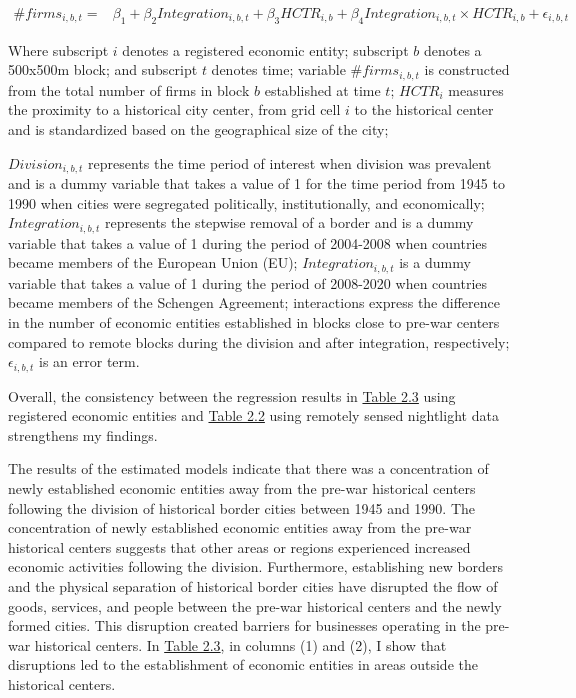 \documentclass[12pt]{article}    %
\begin{document}
\begin{equation}
\renewcommand\theequation{2.3}
\begin{split}
\# firms_{i,b,t}=&\beta_1+\beta _2 Integration_{i,b,t}+ \beta_{3} HCTR_{i,b} +\beta_4 Integration_{i,b,t}\times HCTR_{i,b}+\epsilon_{i,b,t}
    \end{split}
\end{equation}
\par 


Where subscript $i$ denotes a registered economic entity; subscript $b$ denotes a 500x500m block; and subscript $t$ denotes time; variable $\# firms_{i,b,t}$ is constructed from the total number of firms in block $b$ established at time $t$; $HCTR_{i}$ measures the proximity  to a historical city center, from grid cell $i$ to the historical center and is standardized based on the geographical size of the city; 



$Division_{i,b,t}$ represents the time period of interest when division was prevalent and is a dummy variable that takes a value of 1 for the time period from 1945 to 1990 when cities were  segregated politically, institutionally, and economically; $Integration_{i,b,t}$  represents the stepwise removal of a border and is a dummy variable that takes a value of 1 during the period of 2004-2008 when countries became members of the European Union (EU); $Integration_{i,b,t}$ is a dummy variable that takes a value of 1 during the period of 2008-2020 when countries became members of the Schengen Agreement; interactions express the difference in the number of economic entities established in blocks close to pre-war centers compared to remote blocks during the division and after integration, respectively; $\epsilon_{i,b,t}$ is an error term.

\par Overall, the consistency between the regression results in \hyperlink{Table 2.3}{Table 2.3} using registered economic entities and \hyperlink{Table 2.2}{Table 2.2} using remotely sensed nightlight data strengthens my findings. 

\par The results of the estimated models indicate that there was a concentration of newly established economic entities away from the pre-war historical centers following the division of historical border cities between 1945 and 1990. The concentration of newly established economic entities away from the pre-war historical centers suggests that other areas or regions experienced increased economic activities following the division. Furthermore, establishing new borders and the physical separation of historical border cities have disrupted the flow of goods, services, and people between the pre-war historical centers and the newly formed cities. This disruption created barriers for businesses operating in the pre-war historical centers. In \hyperlink{Table 2.3}{Table 2.3}, in columns (1) and (2), I show that disruptions led to the establishment of economic entities in areas outside the historical centers.
\end{document}
